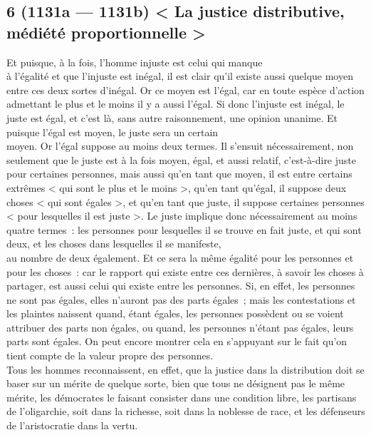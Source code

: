 \documentclass[french,twoside]{book} %
\begin{document}
\subsection[{6 (1131a — 1131b) < La justice distributive, médiété proportionnelle >}]{6 (1131a — 1131b) < La justice distributive, médiété proportionnelle >}
\noindent Et puisque, à la fois, l’homme injuste est celui qui manque \\
à l’égalité et que l’injuste est inégal, il est clair qu’il existe aussi quelque moyen entre ces deux sortes d’inégal. Or ce moyen est l’égal, car en toute espèce d’action admettant le plus et le moins il y a aussi l’égal. Si donc l’injuste est inégal, le juste est égal, et c’est là, sans autre raisonnement, une opinion unanime. Et puisque l’égal est moyen, le juste sera un certain \\
moyen. Or l’égal suppose au moins deux termes. Il s’ensuit nécessairement, non seulement que le juste est à la fois moyen, égal, et aussi relatif, c’est-à-dire juste pour certaines personnes, mais aussi qu’en tant que moyen, il est entre certains extrêmes < qui sont le plus et le moins >, qu’en tant qu’égal, il suppose deux choses < qui sont égales >, et qu’en tant que juste, il suppose certaines personnes < pour lesquelles il est juste >. Le juste implique donc nécessairement au moins quatre termes : les personnes pour lesquelles il se trouve en fait juste, et qui sont deux, et les choses dans lesquelles il se manifeste, \\
au nombre de deux également. Et ce sera la même égalité pour les personnes et pour les choses : car le rapport qui existe entre ces dernières, à savoir les choses à partager, est aussi celui qui existe entre les personnes. Si, en effet, les personnes ne sont pas égales, elles n’auront pas des parts égales ; mais les contestations et les plaintes naissent quand, étant égales, les personnes possèdent ou se voient attribuer des parts non égales, ou quand, les personnes n’étant pas égales, leurs parts sont égales. On peut encore montrer cela en s’appuyant sur le fait qu’on tient compte de la valeur propre des personnes. \\
Tous les hommes reconnaissent, en effet, que la justice dans la distribution doit se baser sur un mérite de quelque sorte, bien que tous ne désignent pas le même mérite, les démocrates le faisant consister dans une condition libre, les partisans de l’oligarchie, soit dans la richesse, soit dans la noblesse de race, et les défenseurs de l’aristocratie dans la vertu.\par
\end{document}
